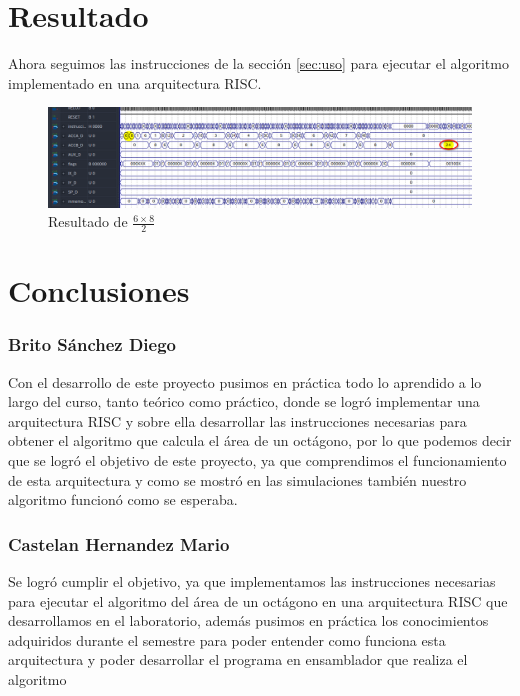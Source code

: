 \documentclass{IEEEtran}
\begin{document}
\section{Resultado}
\label{sec:orge7f67d7}
Ahora seguimos las instrucciones de la sección \ref{sec:uso} para ejecutar el algoritmo implementado en una arquitectura RISC.
\begin{figure}[htbp]
\centering
\includegraphics[width=.9\linewidth]{../img/7.png}
\caption{Resultado de \(\frac{6 \times 8}{2}\)}
\end{figure}
\section{Conclusiones}
\label{sec:org213234e}
\subsubsection{Brito Sánchez Diego}
\label{sec:orgc3ea57f}
Con el desarrollo de este proyecto pusimos en práctica todo lo aprendido a lo largo del curso, tanto teórico como práctico, donde se logró implementar una arquitectura RISC y sobre ella desarrollar las instrucciones necesarias para obtener el algoritmo que calcula el área de un octágono, por lo que podemos decir que se logró el objetivo de este proyecto, ya que comprendimos el funcionamiento de esta arquitectura y como se mostró en las simulaciones también nuestro algoritmo funcionó como se esperaba.
\subsubsection{Castelan Hernandez Mario}
\label{sec:org9a76aee}
Se logró cumplir el objetivo, ya que implementamos las instrucciones necesarias para ejecutar el algoritmo del área de un octágono en una arquitectura RISC que desarrollamos en el laboratorio, además pusimos en práctica los conocimientos adquiridos durante el semestre para poder entender como funciona esta arquitectura y poder desarrollar el programa en ensamblador que realiza el algoritmo
\end{document}
